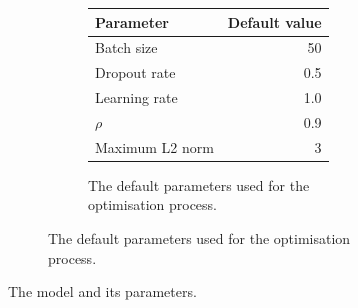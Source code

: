 \begin{figure}[p]
\begin{subfigure}[b]{0.45\textwidth}
    \begin{subfigure}[b]{\textwidth}
      \centering
      \begin{tabular}{lr}
	\toprule
	Parameter & Default value \\
	\midrule
	Batch size & 50 \\
	Dropout rate & 0.5 \\
	Learning rate & 1.0 \\
	$\rho$ & 0.9 \\
	Maximum L2 norm & 3 \\
	\bottomrule
      \end{tabular}
      \caption{The default parameters used for the optimisation
	process.\label{tbl:params}}
    \end{subfigure}
  \end{subfigure}
  \caption{The model and its parameters.\label{fig:model_full}}
\end{figure}

